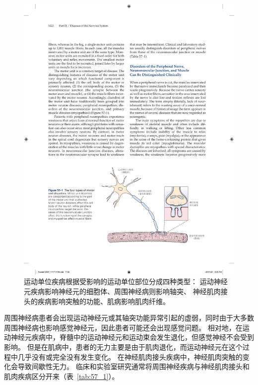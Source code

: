 \begin{figure}[htbp]
	\centering
	\includegraphics[width=0.91\linewidth]{chap57/fig_57_1}
	\caption{运动单位疾病根据受影响的运动单位部位分成四种类型：
		运动神经元疾病影响神经元的细胞体、周围神经病则影响轴突、
		神经肌肉接头的疾病影响突触的功能、肌病影响肌肉纤维。}
	\label{fig:57_1}
\end{figure}


周围神经病患者会出现运动神经元或其轴突功能异常引起的虚弱，同时由于大多数周围神经病也影响感觉神经元，因此患者可能还会出现感觉问题。
相对地，在运动神经元疾病中，脊髓中的运动神经元和运动束会发生退化，但感觉神经不会受到影响。
但是在肌病中，患者的无力主要是由于肌肉退化，而运动神经元在这个过程中几乎没有或完全没有发生变化。
在神经肌肉接头疾病中，神经肌肉突触的变化会导致间歇性无力。
临床和实验室研究通常将周围神经疾病与神经肌肉接头和肌肉疾病区分开来（表~\ref{tab:57_1}）。



